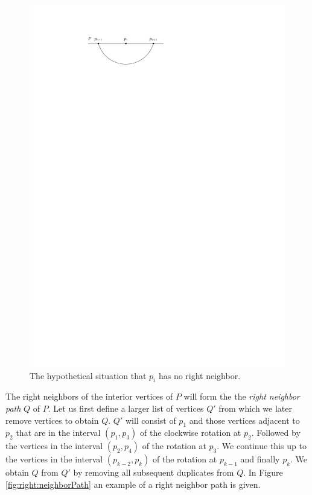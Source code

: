     \begin{figure}[h]
      \centering
      \includegraphics[scale=1]{unifiedAlgo/img/rightNeighbourwalk/pHasRightNeighbor.pdf}
      \caption{The hypothetical situation that $p_i$ has no right neighbor.}
      \label{fig:right:pHasRightNeighbor}
    \end{figure}

    The right neighbors of the interior vertices of $P$ will form the the \emph{right neighbor path} $Q$ of $P$.
    Let us first define a larger list of vertices $Q'$ from which we later remove vertices to obtain $Q$. $Q'$ will consist of $p_1$ and those vertices adjacent to $p_{2}$ that are in the interval $(p_1, p_3)$ of the clockwise rotation at $p_2$. Followed by the vertices in the interval $(p_2, p_4)$ of the rotation at $p_{3}$. We continue this up to the vertices in the interval $(p_{k-2}, p_k)$ of the rotation at $p_{k-1}$ and finally $p_k$.
    We obtain $Q$ from $Q'$ by removing all subsequent duplicates from $Q$.
    In Figure \ref{fig:right:neighborPath} an example of a right neighbor path is given.

